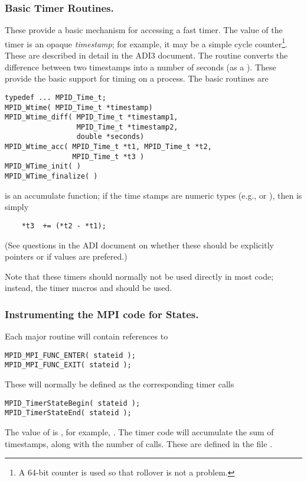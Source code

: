 \documentclass{article}
\begin{document}
\subsubsection{Basic Timer Routines.}
These provide a basic mechanism for accessing a fast timer.  The value of the
timer is an opaque \emph{timestamp}; for example, it may be a simple cycle
counter\footnote{A 64-bit counter is used so that rollover is not a
problem.}.  These 
are described in detail in the ADI3 document. 
The routine  converts the difference
between two timestamps into a number of seconds (as a ).  These
provide the basic support for timing on a process.  The basic routines are

\begin{verbatim}
typedef ... MPID_Time_t;
MPID_Wtime( MPID_Time_t *timestamp)
MPID_Wtime_diff( MPID_Time_t *timestamp1, 
                 MPID_Time_t *timestamp2, 
                 double *seconds)
MPID_Wtime_acc( MPID_Time_t *t1, MPID_Time_t *t2, 
                MPID_Time_t *t3 )
MPID_WTime_init( )
MPID_WTime_finalize( )
\end{verbatim}
 is an accumulate function; if the time stamps are numeric
types (e.g.,  or ), then  is
simply
\begin{verbatim}
    *t3  += (*t2 - *t1);
\end{verbatim}
(See questions in the ADI document on whether these should be explicitly
pointers or if values are prefered.)

Note that these timers should normally not be used directly in most
code; instead, 
the timer macros  and
 should be used.  

\subsubsection{Instrumenting the MPI code for States.}
Each major routine will contain references to 
\begin{verbatim}
MPID_MPI_FUNC_ENTER( stateid );
MPID_MPI_FUNC_EXIT( stateid );
\end{verbatim}
These will normally be defined as the corresponding timer calls
\begin{verbatim}
MPID_TimerStateBegin( stateid );
MPID_TimerStateEnd( stateid );
\end{verbatim}
The value of  is , for example,
.  The timer code will accumulate the sum of
timestamps, along with the number of calls.  These are defined in the file
. 
\end{document}
